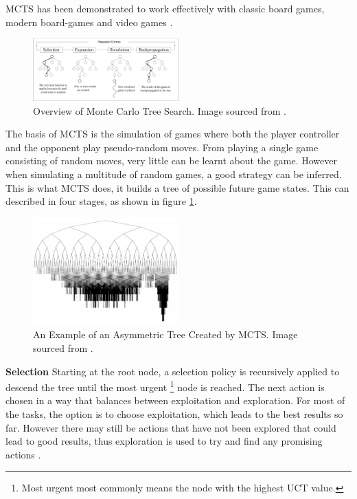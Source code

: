 \documentclass[journal]{IEEEtran}
\begin{document}
		MCTS has been demonstrated to work effectively with classic board games, modern board-games and video games \cite{chaslot2008monte, pepels2014real}.

		\begin{figure}[h]
		    \centering
		    \includegraphics[width=0.5\textwidth]{MCTSProcess}
		    \caption{Overview of Monte Carlo Tree Search. Image sourced from \cite{chaslot2008monte}. }
		    \label{fig:MCTS1}
		\end{figure}
		

		The basis of MCTS is the simulation of games where both the player controller and the opponent play pseudo-random moves. From playing a single game consisting of random moves, very little can be learnt about the game. However when simulating a multitude of random games, a good strategy can be inferred. This is what MCTS does, it builds a tree of possible future game states. This can described in four stages, as shown in figure \ref{fig:MCTS1}.
				\begin{figure}[h]
		    \centering
		    \includegraphics[width=0.5\textwidth]{MCTSasymmetry}
		    \caption{An Example of an Asymmetric Tree Created by MCTS. Image sourced from \cite{coquelin2007bandit}. }
		    \label{fig:MCTS2}
		\end{figure}


		\textbf{Selection}
			Starting at the root node, a selection policy is recursively applied to descend the tree until the most urgent \footnote{Most urgent most commonly means the node with the highest UCT value.} node is reached. 
			The next action is chosen in a way that balances between exploitation and exploration. For most of the tasks, the option is to choose exploitation, which leads to the best results so far. However there may still be actions that have not been explored that could lead to good results, thus exploration is used to try and find any promising actions \cite{chaslot2008monte}.
			
\end{document}
